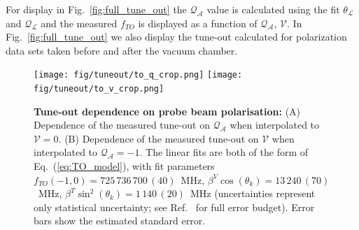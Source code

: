 
	For display in Fig.~\ref{fig:full_tune_out} the $\mathcal{Q_{A}}$ value is calculated using the fit $\theta_{\mathcal{L}}$ and $\mathcal{Q_{L}}$ and the measured \(f_{TO}\) is displayed as a function of $\mathcal{Q_{A}}$, $\mathcal{V}$. In Fig.~\ref{fig:full_tune_out} we also display the tune-out calculated for polarization data sets taken before and after the vacuum chamber.%




	\begin{figure}
	\centering
	\texttt{[image: fig/tuneout/to\_q\_crop.png]}
	\texttt{[image: fig/tuneout/to\_v\_crop.png]}
	\caption{\textbf{Tune-out dependence on probe beam polarisation:}
	(A) Dependence of the measured tune-out on $\mathcal{Q_{A}}$ when interpolated to $\mathcal{V}=0$. (B) Dependence of the measured tune-out on $\mathcal{V}$ when interpolated to $\mathcal{Q_{A}}=-1$. The linear fits are both of the form of Eq.~(\ref{eq:TO_model}), with fit parameters \(f_{TO}(-1,0)=725\,736\,700\,(40)\)~MHz, \(\beta^V \cos(\theta_k)=13\,240\,(70)\)~MHz, \(\beta^T \sin^2(\theta_k)=1\,140\,(20)\)~MHz (uncertainties represent only statistical uncertainty; see Ref.~\cite{ArxivTO} for full error budget). Error bars show the estimated standard error.
	} 
	\label{fig:pol_TO} 
	\end{figure}




